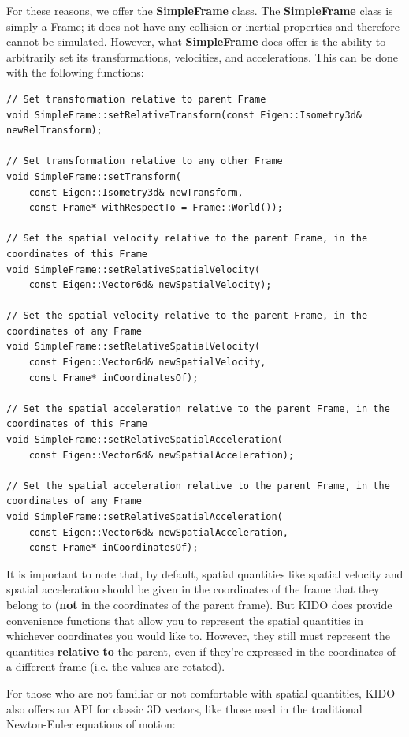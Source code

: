 For these reasons, we offer the \textbf{SimpleFrame} class. The \textbf{SimpleFrame} class is simply a Frame; it does not have any collision or inertial properties and therefore cannot be simulated. However, what \textbf{SimpleFrame} does offer is the ability to arbitrarily set its transformations, velocities, and accelerations. This can be done with the following functions:

\begin{lstlisting}
// Set transformation relative to parent Frame
void SimpleFrame::setRelativeTransform(const Eigen::Isometry3d& newRelTransform);

// Set transformation relative to any other Frame
void SimpleFrame::setTransform(
    const Eigen::Isometry3d& newTransform,
    const Frame* withRespectTo = Frame::World());
    
// Set the spatial velocity relative to the parent Frame, in the coordinates of this Frame
void SimpleFrame::setRelativeSpatialVelocity(
    const Eigen::Vector6d& newSpatialVelocity);
    
// Set the spatial velocity relative to the parent Frame, in the coordinates of any Frame
void SimpleFrame::setRelativeSpatialVelocity(
    const Eigen::Vector6d& newSpatialVelocity,
    const Frame* inCoordinatesOf);
    
// Set the spatial acceleration relative to the parent Frame, in the coordinates of this Frame
void SimpleFrame::setRelativeSpatialAcceleration(
    const Eigen::Vector6d& newSpatialAcceleration);

// Set the spatial acceleration relative to the parent Frame, in the coordinates of any Frame
void SimpleFrame::setRelativeSpatialAcceleration(
    const Eigen::Vector6d& newSpatialAcceleration,
    const Frame* inCoordinatesOf);
\end{lstlisting}

It is important to note that, by default, spatial quantities like spatial velocity and spatial acceleration should be given in the coordinates of the frame that they belong to (\textbf{not} in the coordinates of the parent frame). But KIDO does provide convenience functions that allow you to represent the spatial quantities in whichever coordinates you would like to. However, they still must represent the quantities \textbf{relative to} the parent, even if they're expressed in the coordinates of a different frame (i.e. the values are rotated).

For those who are not familiar or not comfortable with spatial quantities, KIDO also offers an API for classic 3D vectors, like those used in the traditional Newton-Euler equations of motion:

